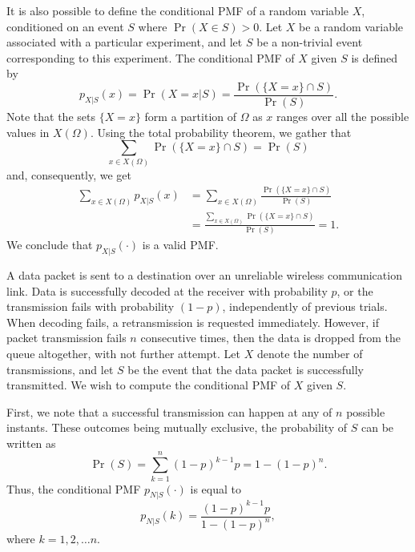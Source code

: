 It is also possible to define the conditional PMF of a random variable $X$, conditioned on an event $S$ where $\Pr (X \in S) > 0$.
Let $X$ be a random variable associated with a particular experiment, and let $S$ be a non-trivial event corresponding to this experiment.
The conditional PMF of $X$ given $S$ is defined by
\begin{equation} \label{equation:ConditionalEventPMF}
p_{X|S} (x) = \Pr (X = x | S)
= \frac{\Pr (\{X = x\} \cap S)}{\Pr (S)} .
\end{equation}
Note that the sets $\{ X = x \}$ form a partition of $\Omega$ as $x$ ranges over all the possible values in $X (\Omega)$.
Using the total probability theorem, we gather that
\begin{equation*}
\sum_{x \in X(\Omega)} \Pr ( \{X = x\} \cap S) = \Pr (S)
\end{equation*}
and, consequently, we get
\begin{equation*}
\begin{split}
\sum_{x \in X(\Omega)} p_{X|S} (x)
&= \sum_{x \in X(\Omega)} \frac{\Pr (\{X = x\} \cap S)}{\Pr (S)} \\
&= \frac{\sum_{x \in X(\Omega)} \Pr (\{X = x\} \cap S)}{\Pr (S)}
=1 .
\end{split}
\end{equation*}
We conclude that $p_{X|S} (\cdot)$ is a valid PMF.

\begin{example}
A data packet is sent to a destination over an unreliable wireless communication link.
Data is successfully decoded at the receiver with probability $p$, or the transmission fails with probability $(1-p)$, independently of previous trials.
When decoding fails, a retransmission is requested immediately.
However, if packet transmission fails $n$ consecutive times, then the data is dropped from the queue altogether, with not further attempt.
Let $X$ denote the number of transmissions, and let $S$ be the event that the data packet is successfully transmitted.
We wish to compute the conditional PMF of $X$ given $S$.

First, we note that a successful transmission can happen at any of $n$ possible instants.
These outcomes being mutually exclusive, the probability of $S$ can be written as
\begin{equation*}
\Pr(S) = \sum_{k=1}^n (1-p)^{k-1} p = 1 - (1-p)^n .
\end{equation*}
Thus, the conditional PMF $p_{N|S} (\cdot)$ is equal to
\begin{equation*}
p_{N|S} (k) = \frac{ (1-p)^{k-1} p }{1 - (1-p)^n} ,
\end{equation*}
where $k = 1, 2, \ldots n$.
\end{example}


